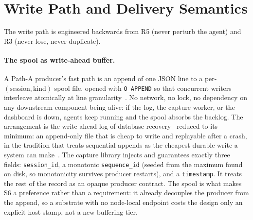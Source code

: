 \section{Write Path and Delivery Semantics}
\label{sec:design-write}

The write path is engineered backwards from R5 (never perturb the agent) and
R3 (never lose, never duplicate).

\paragraph{The spool as write-ahead buffer.} A Path-A producer's fast path is
an append of one JSON line to a per-\((\text{session}, \text{kind})\) spool
file, opened with \texttt{O\_APPEND} so that concurrent writers interleave
atomically at line granularity~\cite{posix2018}.
No network, no lock, no dependency on any
downstream component being alive: if the log, the capture worker, or the
dashboard is down, agents keep running and the spool absorbs the backlog.
The arrangement is the write-ahead log of database recovery~\cite{mohan1992aries}
reduced to its minimum: an append-only file that is cheap to write and
replayable after a crash, in the tradition that treats sequential appends as
the cheapest durable write a system can make~\cite{rosenblum1992lfs}.
The capture library injects and guarantees exactly three fields:
\texttt{session\_id}, a monotonic \texttt{sequence\_id} (seeded from the
maximum found on disk, so monotonicity survives producer restarts), and a
\texttt{timestamp}. It treats the rest of the record as an opaque
producer contract. The spool is what makes S6 a preference rather
than a requirement: it already decouples the producer from the append, so a
substrate with no node-local endpoint costs the design only an explicit host
stamp, not a new buffering tier.

